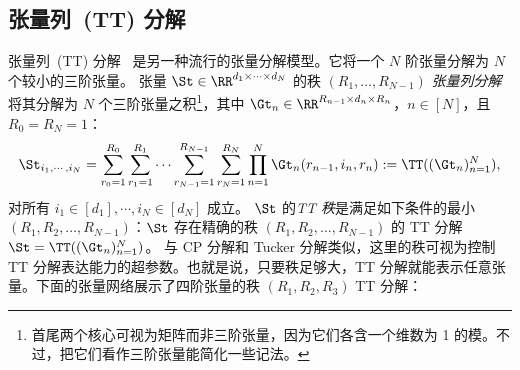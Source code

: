 \subsection{张量列~(TT) 分解}\label{sec:tt-decomposition}
张量列~(TT) 分解~\citep{oseledets2010approximation} 是另一种流行的张量分解模型。它将一个 $N$ 阶张量分解为 $N$ 个较小的三阶张量。 
张量 $\St\in\RR^{d_1\times\cdots\times d_N}$ 的秩 $(R_1,\dots,R_{N-1})$ \textit{张量列分解}将其分解为 $N$ 个三阶张量之积\footnote{首尾两个核心可视为矩阵而非三阶张量，因为它们各含一个维数为 1 的模。不过，把它们看作三阶张量能简化一些记法。}，其中 $\Gt_n\in\RR^{R_{n-1}\times d_n\times R_n}$，$n\in [N]$，且 $R_0=R_N=1$：
$$\St_{i_1,\cdots,i_N}= \sum_{r_0=1}^{R_0}\sum_{r_1=1}^{R_1} \cdots \sum_{r_{N-1}=1}^{R_{N-1}}\sum_{r_N=1}^{R_N} \prod_{n=1}^N\Gt_n(r_{n-1},i_n,r_n) := \TT(({\Gt_n})_{n=1}^N),$$ 
对所有 $i_1\in[d_1],\cdots,i_N\in[d_N]$ 成立。  
$\St$ 的\emph{TT 秩}是满足如下条件的最小
$(R_1,R_2,\dots,R_{N-1})$：$\St$ 存在精确的秩 $(R_1,R_2,\dots,R_{N-1})$ 的 TT 分解 $\St=\TT(({\Gt_n})_{n=1}^N)$。
与 CP 分解和 Tucker 分解类似，这里的秩可视为控制 TT 分解表达能力的超参数。也就是说，只要秩足够大，TT 分解就能表示任意张量。下面的张量网络展示了四阶张量的秩 $(R_1,R_2,R_3)$ TT 分解：


